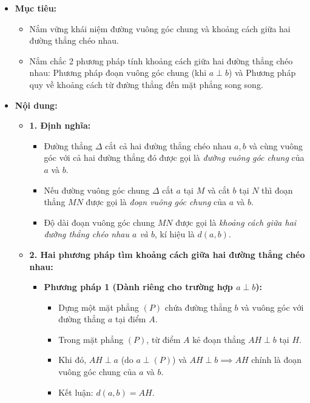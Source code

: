 \documentclass[12pt, a4paper]{article}
\begin{document}
\begin{itemize}[leftmargin=1.2cm]
    \item[a)] \textbf{Mục tiêu:}
    \begin{itemize}[leftmargin=0.6cm]
        \item Nắm vững khái niệm đường vuông góc chung và khoảng cách giữa hai đường thẳng chéo nhau.
        \item Nắm chắc 2 phương pháp tính khoảng cách giữa hai đường thẳng chéo nhau: Phương pháp đoạn vuông góc chung (khi $a \perp b$) và Phương pháp quy về khoảng cách từ đường thẳng đến mặt phẳng song song.
    \end{itemize}

    \item[b)] \textbf{Nội dung:}
    \begin{itemize}[leftmargin=0.6cm]
        \item \textbf{1. Định nghĩa:}
        \begin{itemize}
            \item Đường thẳng $\Delta$ cắt cả hai đường thẳng chéo nhau $a, b$ và cùng vuông góc với cả hai đường thẳng đó được gọi là \textit{đường vuông góc chung} của $a$ và $b$.
            \item Nếu đường vuông góc chung $\Delta$ cắt $a$ tại $M$ và cắt $b$ tại $N$ thì đoạn thẳng $MN$ được gọi là \textit{đoạn vuông góc chung} của $a$ và $b$.
            \item Độ dài đoạn vuông góc chung $MN$ được gọi là \textit{khoảng cách giữa hai đường thẳng chéo nhau $a$ và $b$}, kí hiệu là $d(a, b)$.
        \end{itemize}

        \item \textbf{2. Hai phương pháp tìm khoảng cách giữa hai đường thẳng chéo nhau:}
        \begin{itemize}
            \item \textbf{Phương pháp 1 (Dành riêng cho trường hợp $a \perp b$):}
            \begin{itemize}
                \item Dựng một mặt phẳng $(P)$ chứa đường thẳng $b$ và vuông góc với đường thẳng $a$ tại điểm $A$.
                \item Trong mặt phẳng $(P)$, từ điểm $A$ kẻ đoạn thẳng $AH \perp b$ tại $H$.
                \item Khi đó, $AH \perp a$ (do $a \perp (P)$) và $AH \perp b \implies AH$ chính là đoạn vuông góc chung của $a$ và $b$.
                \item Kết luận: $d(a, b) = AH$.
            \end{itemize}


\end{itemize}
\end{itemize}
\end{itemize}
\end{document}
